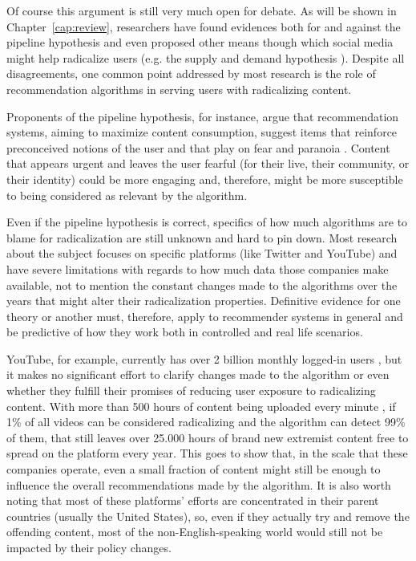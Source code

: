 Of course this argument is still very much open for debate. As will be shown in
Chapter~\ref{cap:review}, researchers have found evidences both for and against
the pipeline hypothesis and even proposed other means though which social media
might help radicalize users (e.g. the supply and demand hypothesis
\citep{munger_right-wing_2020}). Despite all disagreements, one common point
addressed by most research is the role of recommendation algorithms in serving
users with radicalizing content.

Proponents of the pipeline hypothesis, for instance, argue that recommendation
systems, aiming to maximize content consumption, suggest items that reinforce
preconceived notions of the user and that play on fear and paranoia
\citep{ribeiro_auditing_2020}. Content that appears urgent and leaves the user
fearful (for their live, their community, or their identity) could be more
engaging and, therefore, might be more susceptible to being considered as
relevant by the algorithm.

Even if the pipeline hypothesis is correct, specifics of how much algorithms are
to blame for radicalization are still unknown and hard to pin down. Most
research about the subject focuses on specific platforms (like Twitter and
YouTube) and have severe limitations with regards to how much data those
companies make available, not to mention the constant changes made to the
algorithms over the years that might alter their radicalization properties.
Definitive evidence for one theory or another must, therefore, apply to
recommender systems in general and be predictive of how they work both in
controlled and real life scenarios.

YouTube, for example, currently has over 2 billion monthly logged-in users
\citep{noauthor_youtube_nodate}, but it makes no significant effort to clarify
changes made to the algorithm or even whether they fulfill their promises of
reducing user exposure to radicalizing content. With more than 500 hours of
content being uploaded every minute \citep{noauthor_youtube_nodate}, if 1\% of
all videos can be considered radicalizing and the algorithm can detect 99\% of
them, that still leaves over 25.000 hours of brand new extremist content free to
spread on the platform every year. This goes to show that, in the scale that
these companies operate, even a small fraction of content might still be enough
to influence the overall recommendations made by the algorithm. It is also worth
noting that most of these platforms' efforts are concentrated in their parent
countries (usually the United States), so, even if they actually try and remove
the offending content, most of the non-English-speaking world would still not be
impacted by their policy changes.

